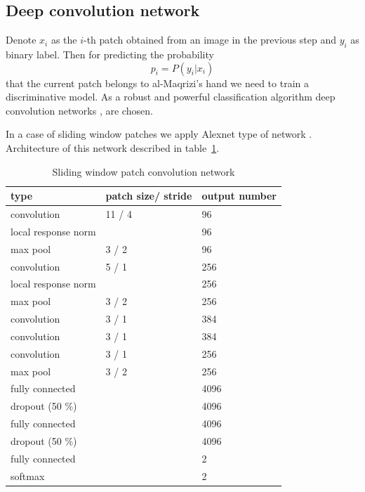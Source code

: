 \documentclass[conference,a4paper,twocolumn]{IEEEtran}
\begin{document}

\subsection{Deep convolution network}

Denote $x_i$ as the $i$-th patch obtained from an image in the previous step and $y_i$ as binary label. Then for predicting the probability
\begin{equation*}
	p_i = P(y_i | x_i)
\end{equation*}
that the current patch belongs to al-Maqrizi's hand we need to train a discriminative model. As a robust and powerful classification algorithm deep convolution networks \cite{DL}, \cite{CNN} are chosen. 

In a case of sliding window patches we apply Alexnet type of network \cite{Alexnet}. Architecture of this network described in table~\ref{alexnet_tab}.
\begin{table}[!h]
\centering
\caption{Sliding window patch convolution network}
\label{alexnet_tab}
\begin{tabular}{|l|p{1.3cm}|p{1.3cm}|}
\hline
\textbf{type} & \textbf{patch size/ stride} & \textbf{output number}  \\
\hline
convolution & 11 / 4 & 96 \\
\hline
local response norm & & 96 \\
\hline
max pool & 3 / 2 & 96 \\
\hline
convolution & 5 / 1 & 256 \\
\hline
local response norm & & 256 \\
\hline
max pool & 3 / 2 & 256 \\
\hline
convolution & 3 / 1 & 384 \\
\hline
convolution & 3 / 1 & 384 \\
\hline
convolution & 3 / 1 & 256 \\
\hline
max pool & 3 / 2 & 256 \\
\hline
fully connected & & 4096 \\
\hline
dropout (50 \%) & & 4096 \\
\hline
fully connected & & 4096 \\
\hline
dropout (50 \%) & & 4096 \\
\hline
fully connected & & 2 \\
\hline
softmax & & 2 \\
\hline
\end{tabular}
\end{table}
\end{document}
